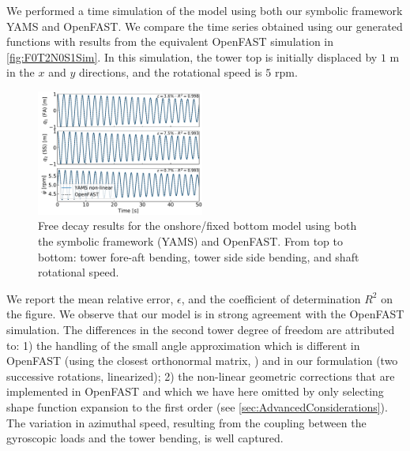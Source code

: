 \documentclass[wes, manuscript]{copernicus}
\begin{document}
We performed a time simulation of the model using both our symbolic framework YAMS and OpenFAST.
We compare the time series obtained using our generated functions with results from the equivalent OpenFAST simulation in \autoref{fig:F0T2N0S1Sim}. In this simulation, the tower top is initially displaced by $1$ \unit{m} in the $x$ and $y$ directions, and the rotational speed is $5$ \unit{rpm}.
\noindent\begin{figure}[!htb]\centering%
  \includegraphics[width=0.49\textwidth]{figs/F0T2N0S1Sim}
  \caption{Free decay results for the onshore/fixed bottom model using both the symbolic framework (YAMS) and OpenFAST. From top to bottom: tower fore-aft bending, tower side side bending, and shaft rotational speed.}\label{fig:F0T2N0S1Sim}%
\end{figure}
We report the mean relative error, $\epsilon$, and the coefficient of determination $R^2$ on the figure.
We observe that our model is in strong agreement with the OpenFAST simulation. The differences in the second tower degree of freedom are attributed to: 1) the handling of the small angle approximation which is different in OpenFAST (using the closest orthonormal matrix, \cite{Jonkman:2009}) and in our formulation (two successive rotations, linearized); 2) the non-linear geometric corrections that are implemented in OpenFAST and which we have here omitted by only selecting shape function expansion to the first order (see \autoref{sec:AdvancedConsiderations}). 
The variation in azimuthal speed, resulting from the coupling between the gyroscopic loads and the tower bending, is well captured. 
\end{document}
